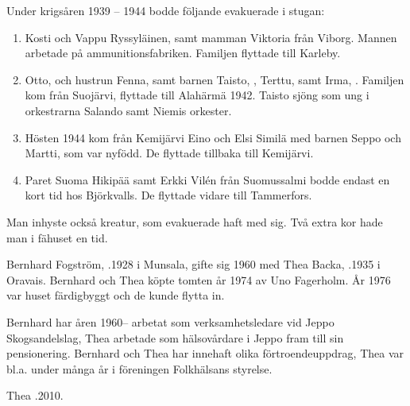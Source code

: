 Under krigsåren 1939 – 1944 bodde följande evakuerade i stugan:
\begin{enumerate}
  \item Kosti och Vappu Ryssyläinen, samt mamman Viktoria från Viborg. Mannen arbetade på ammunitionsfabriken. Familjen
	flyttade till Karleby.
  \item Otto,  och hustrun Fenna,  samt barnen Taisto, , Terttu,  samt Irma, . Familjen kom från Suojärvi, flyttade till Alahärmä 1942. Taisto sjöng som ung i 	orkestrarna Salando samt Niemis orkester.
  \item Hösten 1944 kom från Kemijärvi Eino och Elsi Similä med barnen Seppo och Martti, som var nyfödd. De flyttade tillbaka till Kemijärvi.
  \item Paret Suoma Hikipää samt Erkki Vilén från Suomussalmi bodde endast en kort tid hos Björkvalls. De flyttade vidare till Tammerfors.
\end{enumerate}

Man inhyste också kreatur, som evakuerade haft med sig. Två extra kor hade man i fähuset en tid.




Bernhard Fogström, .1928 i Munsala, gifte sig 1960 med Thea Backa, .1935 i Oravais. Bernhard och Thea köpte tomten år 1974 av Uno Fagerholm. År 1976 	var huset färdigbyggt och de kunde flytta in.
\begin{jhchildren}
  \item {}
  \item {}
  \item {}
\end{jhchildren}
Bernhard har åren 1960-- arbetat som verksamhetsledare vid Jeppo Skogsandelslag, Thea arbetade som hälsovårdare i Jeppo fram	till sin pensionering. Bernhard och Thea har innehaft olika förtroendeuppdrag, Thea var bl.a. under många år i föreningen Folkhälsans styrelse.

Thea .2010.




